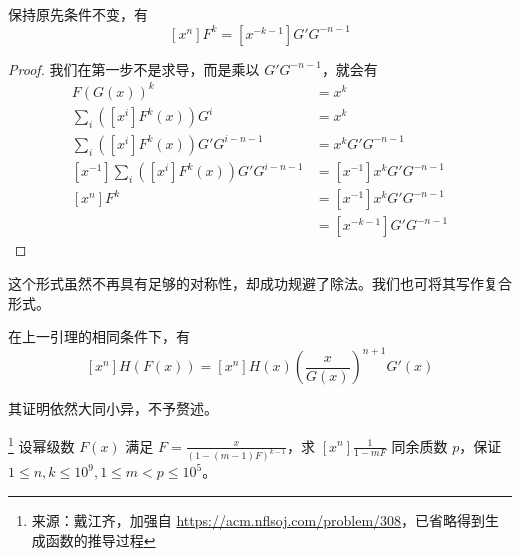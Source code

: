 \begin{lemma}[另类 Lagrange 反演]
保持原先条件不变，有
$$
[x^n]F^k = [x^{-k-1}]G'G^{-n-1}
$$
\end{lemma}

\begin{proof} 我们在第一步不是求导，而是乘以 $G'G^{-n-1}$，就会有
\begin{align*}
F(G(x))^k &= x^k\\
\sum_i ([x^i]F^k(x))G^i &= x^k\\
\sum_i ([x^i]F^k(x))G'G^{i-n-1} &= x^k G'G^{-n-1}\\
[x^{-1}]\sum_i ([x^i]F^k(x))G'G^{i-n-1} &= [x^{-1}]x^k G'G^{-n-1}\\
[x^n]F^k &= [x^{-1}]x^k G'G^{-n-1}\\
&= [x^{-k-1}]G'G^{-n-1}
\end{align*}
\end{proof}

这个形式虽然不再具有足够的对称性，却成功规避了除法。我们也可将其写作复合形式。

\begin{lemma} 在上一引理的相同条件下，有
$$
[x^n] H(F(x)) = [x^n]H(x)\left(\frac{x}{G(x)}\right)^{n+1}G'(x)
$$
\end{lemma}

其证明依然大同小异，不予赘述。

\begin{problem}[简单的普及组计数]\footnote{来源：戴江齐，加强自 \url{https://acm.nflsoj.com/problem/308}，已省略得到生成函数的推导过程}\label{pjcount}
设幂级数 $F(x)$ 满足 $F = \frac x{(1-(m-1)F)^{k-1}}$，求 $[x^n]\frac 1{1-mF}$ 同余质数 $p$，保证 $1\le n,k\le 10^9, 1\le m < p\le 10^5$。
\end{problem}

